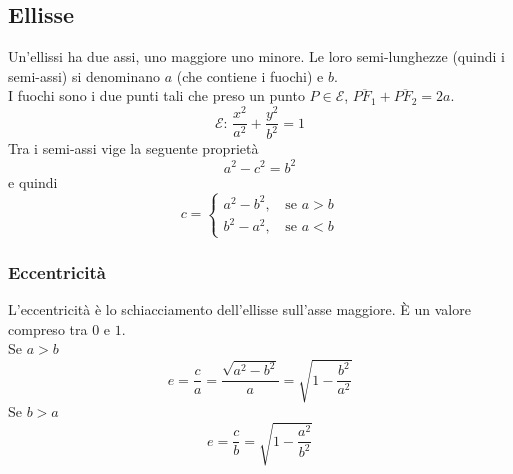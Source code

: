 \subsection{Ellisse}\label{subsec:geomanal:ellisse}
\begin{center}
\end{center}
Un'ellissi ha due assi, uno maggiore uno minore. Le loro semi-lunghezze (quindi i semi-assi) si 
denominano $a$ (che contiene i fuochi) e $b$.\\
I fuochi sono i due punti tali che preso un punto $P\in\mathscr{E}$, 
$\overline{PF_1}+\overline{PF_2} = 2a$.
\begin{equation*}
  \mathscr{E}:\,\frac{x^2}{a^2}+\frac{y^2}{b^2}=1
\end{equation*}
Tra i semi-assi vige la seguente proprietà
\begin{equation*}
  a^2-c^2=b^2
\end{equation*}
e quindi
\begin{equation*}
  c = \begin{cases}
    a^2-b^2,\, &\text{se } a > b\\
    b^2-a^2,\, &\text{se } a < b
  \end{cases}
\end{equation*}

\subsubsection{Eccentricità}
L'eccentricità è lo schiacciamento dell'ellisse sull'asse maggiore. È un valore compreso tra $0$ e 
$1$.\\
Se $a>b$
\begin{equation*}
  e = \frac{c}{a} = \frac{\sqrt{a^2-b^2}}{a}=\sqrt{1-\frac{b^2}{a^2}}
\end{equation*}
Se $b>a$
\begin{equation*}
  e = \frac{c}{b} = \sqrt{1-\frac{a^2}{b^2}}
\end{equation*}

